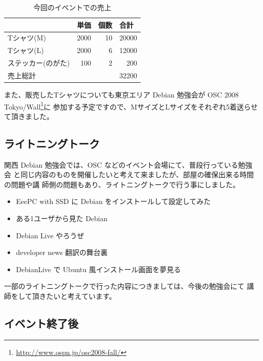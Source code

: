 \documentclass[mingoth,a4paper]{jsarticle}
\begin{document}
\begin{table}[htbp]
\caption{今回のイベントでの売上}
\begin{center}
\begin{tabular}{|l|r|r|r|}
\hline
 & \multicolumn{1}{l|}{単価} & \multicolumn{1}{l|}{個数} & \multicolumn{1}{l|}{合計} \\ \hline
Tシャツ(M) & 2000 & 10 & 20000 \\ \hline
Tシャツ(L) & 2000 & 6 & 12000 \\ \hline
ステッカー(のがた) & 100 & 2 & 200 \\ \hline
売上総計 & \multicolumn{1}{l|}{} & \multicolumn{1}{l|}{} & 32200 \\ \hline 
\end{tabular}
\end{center}
\label{tb:sales}
\end{table}

また、販売したTシャツについても東京エリア Debian 勉強会が
OSC 2008 Tokyo/Wall\footnote{\url{http://www.ospn.jp/osc2008-fall/}}に
参加する予定ですので、MサイズとLサイズをそれぞれ5着送らせて頂きました。

\subsection{ライトニングトーク}

関西 Debian 勉強会では、OSC などのイベント会場にて、普段行っている勉強会
と同じ内容のものを開催したいと考えて来ましたが、部屋の確保出来る時間の問題や講
師側の問題もあり、ライトニングトークで行う事にしました。

\begin{itemize}
 \item EeePC with SSD に Debian をインストールして設定してみた
 \item ある1ユーザから見た Debian
 \item Debian Live やろうぜ
 \item developer news 翻訳の舞台裏
 \item DebianLive で Ubuntu 風インストール画面を夢見る
\end{itemize}

一部のライトニングトークで行った内容につきましては、今後の勉強会にて
講師をして頂きたいと考えています。

\newpage

\subsection{イベント終了後}
\end{document}
